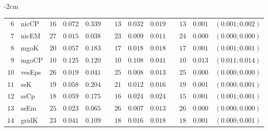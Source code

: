 \begin{table*}[!htbp]
\begin{adjustwidth*}{}{-2cm}
\begin{tabular}{@{}rlrrrrrrrrrcc@{}}
\footnotesize{$6 $} & \footnotesize{nicCP    } & \footnotesize{$16$} & \footnotesize{$0.072$} & \footnotesize{$0.339$} && \footnotesize{$13$} & \footnotesize{$0.032$} & \footnotesize{$0.019$} && \footnotesize{$13$} & \footnotesize{$0.001$} & \footnotesize{$(0.001;0.002)$} \\
\footnotesize{$7 $} & \footnotesize{nicEM    } & \footnotesize{$27$} & \footnotesize{$0.015$} & \footnotesize{$0.038$} && \footnotesize{$23$} & \footnotesize{$0.009$} & \footnotesize{$0.011$} && \footnotesize{$24$} & \footnotesize{$0.000$} & \footnotesize{$(0.000;0.000)$} \\
\footnotesize{$8 $} & \footnotesize{mgoK     } & \footnotesize{$20$} & \footnotesize{$0.057$} & \footnotesize{$0.183$} && \footnotesize{$17$} & \footnotesize{$0.018$} & \footnotesize{$0.018$} && \footnotesize{$17$} & \footnotesize{$0.001$} & \footnotesize{$(0.001;0.001)$} \\
\footnotesize{$9 $} & \footnotesize{mgoCP    } & \footnotesize{$10$} & \footnotesize{$0.125$} & \footnotesize{$0.120$} && \footnotesize{$10$} & \footnotesize{$0.108$} & \footnotesize{$0.041$} && \footnotesize{$10$} & \footnotesize{$0.013$} & \footnotesize{$(0.011;0.014)$} \\
\footnotesize{$10$} & \footnotesize{vesEps   } & \footnotesize{$26$} & \footnotesize{$0.019$} & \footnotesize{$0.041$} && \footnotesize{$25$} & \footnotesize{$0.008$} & \footnotesize{$0.013$} && \footnotesize{$25$} & \footnotesize{$0.000$} & \footnotesize{$(0.000;0.000)$} \\
\footnotesize{$11$} & \footnotesize{ssK      } & \footnotesize{$19$} & \footnotesize{$0.058$} & \footnotesize{$0.204$} && \footnotesize{$21$} & \footnotesize{$0.012$} & \footnotesize{$0.016$} && \footnotesize{$19$} & \footnotesize{$0.001$} & \footnotesize{$(0.000;0.001)$} \\
\footnotesize{$12$} & \footnotesize{ssCp     } & \footnotesize{$18$} & \footnotesize{$0.059$} & \footnotesize{$0.175$} && \footnotesize{$16$} & \footnotesize{$0.024$} & \footnotesize{$0.024$} && \footnotesize{$15$} & \footnotesize{$0.001$} & \footnotesize{$(0.001;0.001)$} \\
\footnotesize{$13$} & \footnotesize{ssEm     } & \footnotesize{$25$} & \footnotesize{$0.023$} & \footnotesize{$0.065$} && \footnotesize{$26$} & \footnotesize{$0.007$} & \footnotesize{$0.013$} && \footnotesize{$26$} & \footnotesize{$0.000$} & \footnotesize{$(0.000;0.000)$} \\
\footnotesize{$14$} & \footnotesize{gridK    } & \footnotesize{$23$} & \footnotesize{$0.041$} & \footnotesize{$0.109$} && \footnotesize{$18$} & \footnotesize{$0.016$} & \footnotesize{$0.018$} && \footnotesize{$18$} & \footnotesize{$0.001$} & \footnotesize{$(0.000;0.001)$} \\

\end{tabular}
\end{adjustwidth*}
\end{table*}

